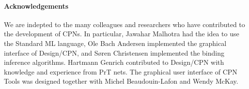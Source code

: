 \documentclass[nocopyrightspace]{sig-alternate}
\begin{document}






\vspace*{-.75em}
\paragraph*{Acknowledgements}  We are indepted to the many colleagues and researchers who have contributed to the development of CPNs. In particular, Jawahar Malhotra had the idea to use the Standard ML language, Ole Bach Andersen implemented the graphical interface of Design/CPN,
and S\o{}ren Christensen implemented the binding inference
algorithms. Hartmann Genrich contributed to Design/CPN with knowledge
and experience from PrT nets. The graphical user interface of CPN
Tools was designed together with Michel Beaudouin-Lafon and Wendy
McKay.

\vspace*{-0.5em}

\end{document}
